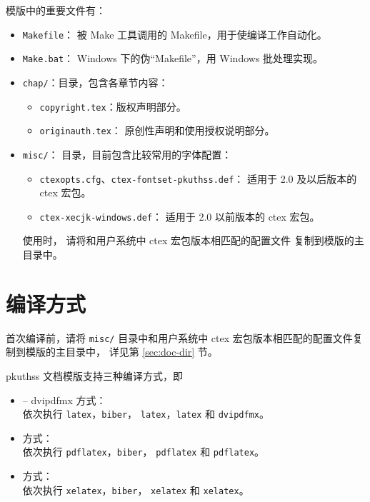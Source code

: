 模版中的重要文件有：
\begin{itemize}
	\item \verb|Makefile|：
		被 Make 工具调用的 Makefile，用于使编译工作自动化。
	\item \verb|Make.bat|：%
		Windows 下的伪“Makefile”，用 Windows 批处理实现。

	\item \verb|chap/|：目录，包含各章节内容：
	\begin{itemize}
		\item \verb|copyright.tex|：版权声明部分。
		\item \verb|originauth.tex|：
			原创性声明和使用授权说明部分\supercite{pku-originauth}。
	\end{itemize}

	\item \verb|misc/|：
		目录，目前包含比较常用的字体配置：
	\begin{itemize}
		\item \verb|ctexopts.cfg|、\verb|ctex-fontset-pkuthss.def|：
			适用于 2.0 及以后版本的 ctex\supercite{ctex} 宏包。
		\item \verb|ctex-xecjk-windows.def|：
			适用于 2.0 以前版本的 ctex 宏包。
	\end{itemize}
	使用时，
	请将和用户系统中 ctex 宏包版本相匹配的配置文件
	复制到模版的主目录中。
\end{itemize}

\section{编译方式}\label{sec:compile}

首次编译前，请将 \verb|misc/| 目录中和用户系统中
ctex 宏包版本相匹配的配置文件复制到模版的主目录中，
详见第 \ref{sec:doc-dir} 节。

pkuthss 文档模版支持三种编译方式，即
\begin{itemize}
	\item {} -- dvipdfmx 方式：\\
		依次执行 \verb|latex|，\verb|biber|，%
		\verb|latex|，\verb|latex| 和 \verb|dvipdfmx|。
	\item {} 方式：\\
		依次执行 \verb|pdflatex|，\verb|biber|，%
		\verb|pdflatex| 和 \verb|pdflatex|。
	\item {} 方式：\\
		依次执行 \verb|xelatex|，\verb|biber|，%
		\verb|xelatex| 和 \verb|xelatex|。
\end{itemize}

